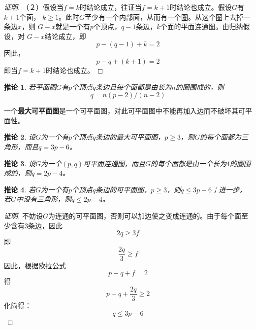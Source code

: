 \documentclass{book}[oneside]
\newtheorem{Cor}{推论}[chapter]
\begin{document}
\begin{CJK*}{UTF8}{gbsn}
\begin{proof}[证明]
  （２）假设当$f=k$时结论成立，往证当$f=k+1$时结论也成立。假设$G$有$k+1$个面，
  $k\geq 1$。此时$G$至少有一个内部面，从而有一个圈。从这个圈上去掉一条边$x$，则
  $G-x$就是一个有$p$个顶点，$q-1$条边，$k$个面的平面连通图。由归纳假设，对
  $G-x$结论成立，即\[p-(q-1) + k =2\]
  因此，\[p-q+ (k+1) =2\]
  即当$f=k+1$时结论也成立。
\end{proof}
 \begin{Cor}
    若平面图$G$有$p$个顶点$q$条边且每个面都是由长为$n$的圈围成的，则
    \begin{equation*}
      q = n(p-2)/(n-2)
    \end{equation*}
  \end{Cor}
一个{\bfseries 最大可平面图}是一个可平面图，对此可平面图中不能再加入边而不破坏其可平面性。
  \begin{Cor}
    设$G$为一个有$p$个顶点$q$条边的最大可平面图，$p \geq 3$，则$G$的每个面都为三角形，而且$q=3p-6$。
  \end{Cor}
  \begin{Cor}
    设$G$为一个$(p,q)$可平面连通图，而且$G$的每个面都是由一个长为$4$的圈围成的，则$q=2p-4$。
  \end{Cor}
  \begin{Cor}
    若$G$为一个有$p$个顶点$q$条边的可平面图，$p\geq 3$，则$q \leq 3p - 6$；进一步，若$G$中没有三角形，则$q \leq 2p -4$。
  \end{Cor}
     \centering
 \begin{proof}[证明]
  不妨设$G$为连通的可平面图，否则可以加边使之变成连通的。由于每个面至少含有3条边，因此
  \[2q \geq 3f\]
  即
  \[\frac{2q}{3} \geq f\]
  因此，根据欧拉公式
  \[p - q + f = 2\]
  得
  \[p - q + \frac{2q}{3} \geq 2\]
  化简得：
  \[q \leq 3p - 6\]


\end{proof}
\end{CJK*}
\end{document}
